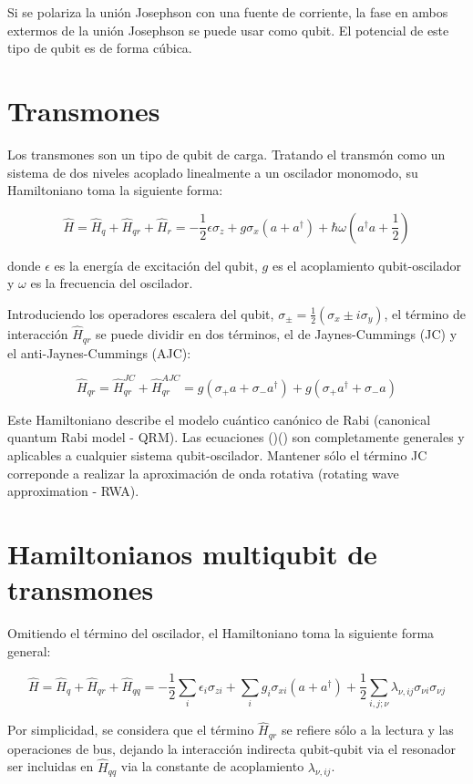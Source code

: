 Si se polariza la unión Josephson con una fuente de corriente, la fase en ambos extermos de la unión Josephson se puede usar como qubit. El potencial de este tipo de qubit es de forma cúbica.

\section{Transmones}

Los transmones son un tipo de qubit de carga. Tratando el transmón como un sistema de dos niveles acoplado linealmente a un oscilador monomodo, su Hamiltoniano toma la siguiente forma:

\[
\hat{H} = \hat{H}_q + \hat{H}_{qr} + \hat{H}_r = -\frac{1}{2} \epsilon \sigma_z + g \sigma_x (a+a^\dag) + \hbar \omega (a^\dag a + \frac{1}{2})
\]

donde $\epsilon$ es la energía de excitación del qubit, $g$ es el acoplamiento qubit-oscilador y $\omega$ es la frecuencia del oscilador.
\vspace{0.5cm}

Introduciendo los operadores escalera del qubit, $\sigma_\pm = \frac{1}{2}(\sigma_x \pm i \sigma_y)$, el término de interacción $\hat{H}_{qr}$ se puede dividir en dos términos, el de Jaynes-Cummings (JC) y el anti-Jaynes-Cummings (AJC):

\[
\hat{H}_{qr} = \hat{H}_{qr}^{JC} + \hat{H}_{qr}^{AJC} = g(\sigma_+ a + \sigma_- a^\dag) + g(\sigma_+ a^\dag + \sigma_- a)
\]

Este Hamiltoniano describe el modelo cuántico canónico de Rabi (canonical quantum Rabi model - QRM). Las ecuaciones ()() son completamente generales y aplicables a cualquier sistema qubit-oscilador. Mantener sólo el término JC correponde a realizar la aproximación de onda rotativa (rotating wave approximation - RWA).

\section{Hamiltonianos multiqubit de transmones}
Omitiendo el término del oscilador, el Hamiltoniano toma la siguiente forma general:

\[
\hat{H} = \hat{H}_q + \hat{H}_{qr} + \hat{H}_{qq} = -\frac{1}{2} \sum\limits_i \epsilon_i \sigma_{zi} + \sum\limits_i g_i \sigma_{xi} (a+a^\dag) + \frac{1}{2} \sum\limits_{i,j;\nu} \lambda_{\nu,ij} \sigma_{\nu i} \sigma_{\nu j}
\]

Por simplicidad, se considera que el término $\hat{H}_{qr}$ se refiere sólo a la lectura y las operaciones de bus, dejando la interacción indirecta qubit-qubit via el resonador ser incluidas en $\hat{H}_{qq}$ via la constante de acoplamiento $\lambda_{\nu,ij}$.

